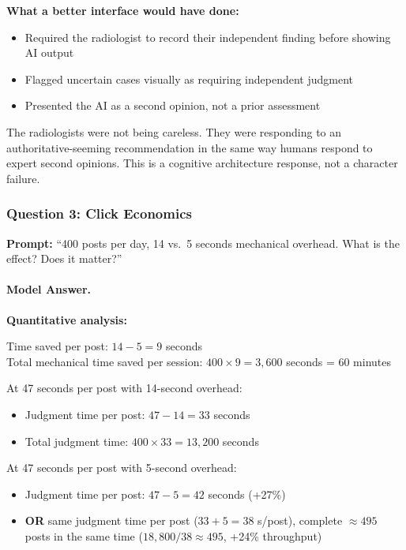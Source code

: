 \textbf{What a better interface would have done:}
\begin{itemize}
    \item Required the radiologist to record their independent finding before showing AI output
    \item Flagged uncertain cases visually as requiring independent judgment
    \item Presented the AI as a second opinion, not a prior assessment
\end{itemize}

The radiologists were not being careless. They were responding to an authoritative-seeming recommendation in the same way humans respond to expert second opinions. This is a cognitive architecture response, not a character failure.

\subsubsection{Question 3: Click Economics}

\textbf{Prompt:} ``400 posts per day, 14 vs.\ 5 seconds mechanical overhead. What is the effect? Does it matter?''

\paragraph{Model Answer.}

\textbf{Quantitative analysis:}

Time saved per post: $14 - 5 = 9$ seconds\\
Total mechanical time saved per session: $400 \times 9 = 3{,}600$ seconds = 60 minutes

At 47 seconds per post with 14-second overhead:
\begin{itemize}
    \item Judgment time per post: $47 - 14 = 33$ seconds
    \item Total judgment time: $400 \times 33 = 13{,}200$ seconds
\end{itemize}

At 47 seconds per post with 5-second overhead:
\begin{itemize}
    \item Judgment time per post: $47 - 5 = 42$ seconds (+27\%)
    \item \textbf{OR} same judgment time per post ($33 + 5 = 38$ s/post), complete $\approx 495$ posts in the same time ($18{,}800 / 38 \approx 495$, +24\% throughput)
\end{itemize}

